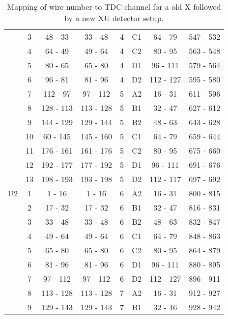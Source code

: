 \documentclass[11pt]{report}
\begin{document}
\begin{itemize}
\begin{table}[!t]
\begin{tabular}{c|c|c|c|c|c|c|c}
   & 3&	48 - 	33&	33 -	48&	4&	C1&	64 -	79&	547 -	532 \\
   & 4&	64 -	49&	49 -	64&	4&	C2&	80 -	95&	563 -	548 \\
   & 5&	80 -	65&	65 -	80&	4&	D1&	96 -	111&	579 -	564 \\
   & 6&	96 -	81&	81 -	96&	4&	D2&	112 -	127&	595 - 	580 \\
   & 7&	112 -	97&	97 -	112&	5&	A2&	16 -	31&	611 -	596 \\
   & 8&	128 -	113&	113 -	128&	5&	B1&	32 - 	47&	627 -	612 \\
   & 9&	144 - 	129&	129 -	144&	5&	B2&	48 -	63&	643 -	628 \\
   & 10& 60 -	145&	145 -	160&	5&	C1&	64 -	79&	659 -	644 \\
   & 11& 176 -	161&	161 -   176&	5&	C2&	80 -	95&	675 -	660 \\
   & 12& 192 -	177&	177 - 	192&	5&	D1&	96 -	111&	691 - 	676 \\
   & 13& 198 -	193&	193 -	198&	5&	D2&	112 -	117&	697 -	692 \\
\hline
U2 & 1&	1 -	16&	1 -	16&	6&	A2&	16 -	31&	800 -	815 \\
   & 2&	17 -	32&	17 -	32&	6&	B1&	32 -	47&	816 -	831 \\
   & 3&	33 -	48&	33 -	48&	6&	B2&	48 -	63&	832 -	847 \\
   & 4&	49 -	64&	49 -	64&	6&	C1&	64 -	79&	848 -	863 \\
   & 5&	65 -	80&	65 -	80&	6&	C2&	80 -	95&	864 -	879 \\
   & 6&	81 -	96&	81 -	96&	6&	D1&	96 -	111&	880 -	895 \\
   & 7&	97 -	112&	97 -	112&	6&	D2&	112 -	127&	896 -	911 \\
   & 8&	113 -	128&	113 -	128&	7&	A2&	16 -	31&	912 -	927 \\
   & 9&	129 -	143&	129 -	143&	7&	B1&	32 -	46&	928 -	942 \\
\hline
\hline
\end{tabular}
\caption{Mapping of wire number to TDC channel for a old X followed by a new XU detector setup.}
\label{table:wire-to-tdc-mapping-XXU}
\end{table}







\end{itemize}
\end{document}
